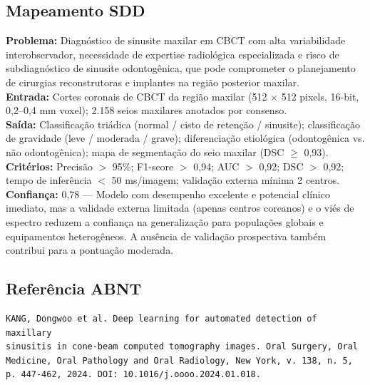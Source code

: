 \subsection{Mapeamento SDD}
\textbf{Problema:} Diagnóstico de sinusite maxilar em CBCT com alta
variabilidade interobservador, necessidade de expertise radiológica
especializada e risco de subdiagnóstico de sinusite odontogênica,
que pode comprometer o planejamento de cirurgias reconstrutoras e
implantes na região posterior maxilar. \\
\textbf{Entrada:} Cortes coronais de CBCT da região maxilar (512
$\times$ 512 pixels, 16-bit, 0,2--0,4 mm voxel); 2.158 seios
maxilares anotados por consenso. \\
\textbf{Saída:} Classificação triádica (normal / cisto de retenção /
sinusite); classificação de gravidade (leve / moderada / grave);
diferenciação etiológica (odontogênica vs. não odontogênica); mapa
de segmentação do seio maxilar (DSC $\geq$ 0,93). \\
\textbf{Critérios:} Precisão $>$ 95\%; F1-score $>$ 0,94; AUC $>$ 0,92;
DSC $>$ 0,92; tempo de inferência $<$ 50 ms/imagem; validação externa
mínima 2 centros. \\
\textbf{Confiança:} 0,78 — Modelo com desempenho excelente e potencial
clínico imediato, mas a validade externa limitada (apenas centros
coreanos) e o viés de espectro reduzem a confiança na generalização
para populações globais e equipamentos heterogêneos. A ausência de
validação prospectiva também contribui para a pontuação moderada.

\subsection{Referência ABNT}
\begin{verbatim}
KANG, Dongwoo et al. Deep learning for automated detection of maxillary
sinusitis in cone-beam computed tomography images. Oral Surgery, Oral
Medicine, Oral Pathology and Oral Radiology, New York, v. 138, n. 5,
p. 447-462, 2024. DOI: 10.1016/j.oooo.2024.01.018.
\end{verbatim}
\endinput
